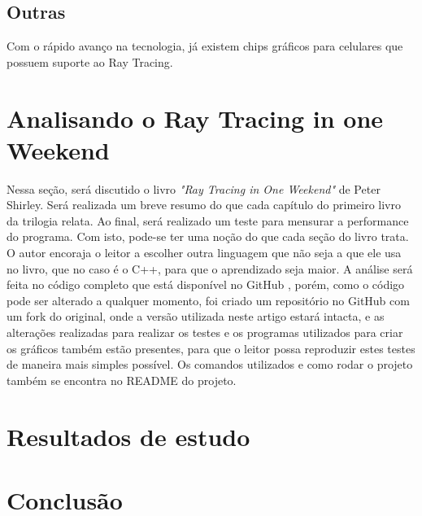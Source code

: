 \documentclass[journal]{IEEEtran}
\begin{document}
\subsection{Outras}
Com o rápido avanço na tecnologia, já existem chips gráficos para celulares que possuem suporte
ao Ray Tracing.


\section{Analisando o Ray Tracing in one Weekend}
Nessa seção, será discutido o livro \emph{"Ray Tracing in One Weekend"} de Peter Shirley. 
\cite{Shirley2020RTW1} Será realizada um breve resumo do que cada capítulo do primeiro
livro da trilogia relata. Ao final, será realizado um teste para mensurar a performance
do programa. Com isto, pode-se ter uma noção do que cada seção do livro trata. O autor
encoraja o leitor a escolher outra linguagem que não seja a que ele usa no livro, que no
caso é o C++, para que o aprendizado seja maior. A análise será feita no código completo
que está disponível no GitHub \cite{RayTracinOneWeekend-GitHub}, porém, como o código
pode ser alterado a qualquer momento, foi criado um repositório no GitHub 
\cite{RayTracinOneWeekend-Artigo} com um fork
do original, onde a versão utilizada neste artigo estará intacta, e as alterações
realizadas para realizar os testes e os programas utilizados para criar os gráficos
também estão presentes, para que o leitor possa reproduzir estes testes de maneira
mais simples possível. Os comandos utilizados e como rodar o projeto também se 
encontra no README do projeto.

\section{Resultados de estudo}

\section{Conclusão}




\end{document}
